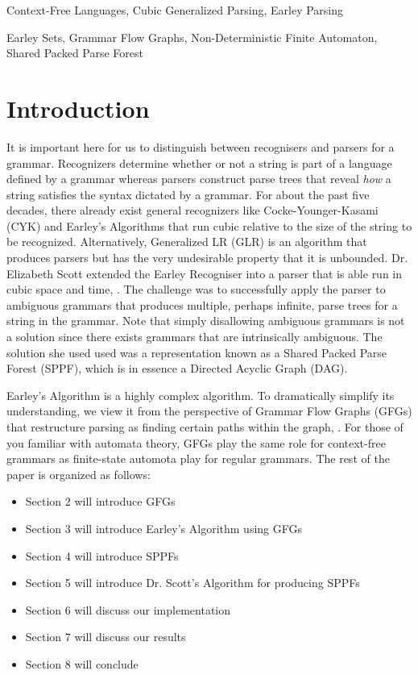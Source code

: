 \documentclass{sigplanconf}
\begin{document}

\terms
Context-Free Languages, Cubic Generalized Parsing, Earley Parsing 

\keywords
Earley Sets, Grammar Flow Graphs, Non-Deterministic Finite Automaton, Shared Packed Parse Forest

\section{Introduction}
It is important here for us to distinguish between recognisers and parsers for a grammar. Recognizers determine whether or not a string is part of a language defined by a grammar whereas parsers construct parse trees that reveal \textit{how} a string satisfies the syntax dictated by a grammar. For about the past five decades, there already exist general recognizers like Cocke-Younger-Kasami (CYK) and Earley's Algorithms that run cubic relative to the size of the string to be recognized. Alternatively, Generalized LR (GLR) is an algorithm that produces parsers but has the very undesirable property that it is unbounded. Dr. Elizabeth Scott extended the Earley Recogniser into a parser that is able run in cubic space and time, \cite{scott}. The challenge was to successfully apply the parser to ambiguous grammars that produces multiple, perhaps infinite, parse trees for a string in the grammar. Note that simply disallowing ambiguous grammars is not a solution since there exists grammars that are intrinsically ambiguous. The solution she used used was a representation known as a Shared Packed Parse Forest (SPPF), which is in essence a Directed Acyclic Graph (DAG).

Earley's Algorithm is a highly complex algorithm. To dramatically simplify its understanding, we view it from the perspective of Grammar Flow Graphs (GFGs) that restructure parsing as finding certain paths within the graph, \cite{bilardi-pingali}. For those of you familiar with automata theory, GFGs play the same role for context-free grammars as finite-state automota play for regular grammars. The rest of the paper is organized as follows:
\begin{itemize}
\item Section 2 will introduce GFGs
\item Section 3 will introduce Earley's Algorithm using GFGs
\item Section 4 will introduce SPPFs
\item Section 5 will introduce Dr. Scott's Algorithm for producing SPPFs
\item Section 6 will discuss our implementation
\item Section 7 will discuss our results
\item Section 8 will conclude
\end{itemize}
\end{document}
